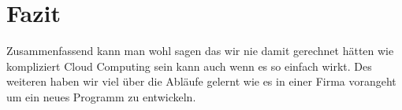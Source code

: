 \chapter{Fazit}
Zusammenfassend kann man wohl sagen das wir nie damit gerechnet hätten wie kompliziert Cloud Computing sein kann auch wenn es so einfach wirkt. Des weiteren haben wir viel über die Abläufe gelernt wie es in einer Firma vorangeht um ein neues Programm zu entwickeln. 